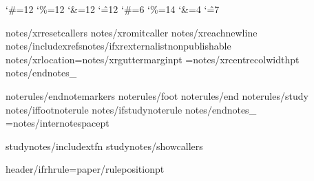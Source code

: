\catcode`\#=12 \catcode`\%=12 \catcode`\&=12 \catcode`\^=12
\catcode`\#=6 \catcode`\%=14 \catcode`\&=4 \catcode`\^=7
%

{notes/xrresetcallers}
{notes/xromitcaller}
{notes/xreachnewline}
{notes/includexrefs}{notes/ifxrexternalist}\expandafter\def\csname x:properties\endcsname{{nonpublishable}}
{notes/xrlocation}\def\XrefNotes{{x}}\XrefNotesMargin={notes/xrguttermargin}pt \XrefNotesWidth={notes/xrcentrecolwidth}pt\def\XrefSide{{{notes/xrcolside}}}
{notes/endnotes_}

{noterules/endnotemarkers}
{noterules/foot}
{noterules/end}
{noterules/study}
{notes/iffootnoterule}\def\FootNoteRuleThickness{{0pt}}
{notes/ifstudynoterule}\def\StudyNoteRuleThickness{{0pt}}
{notes/endnotes_}\def\EndNoteRuleThickness{{0pt}}
\InterNoteSpace={notes/internotespace}pt

{studynotes/includextfn}
{studynotes/showcallers}

\def\HeaderPosition{{{paper/headerposition}}}
\def\FooterPosition{{{paper/footerposition}}}
{header/ifrhrule}\RHruleposition={paper/ruleposition}pt
\def\RangeSeparator{{\kern.1em\char"2013\kern.1em}} %
\def\ChapterVerseSeparator{{\kern.02em{header/chvseparator}\kern.02em}} %

\def\RHevenleft{{{header/evenleft}}}
\def\RHevencenter{{{header/evencenter}}}
\def\RHevenright{{{header/evenright}}}

\def\RHoddleft{{{header/oddleft}}}
\def\RHoddcenter{{{header/oddcenter}}}
\def\RHoddright{{{header/oddright}}}

\def\RHnoVevenleft{{{header/noVevenleft}}}
\def\RHnoVevencenter{{{header/noVevencenter}}}
\def\RHnoVevenright{{{header/noVevenright}}}

